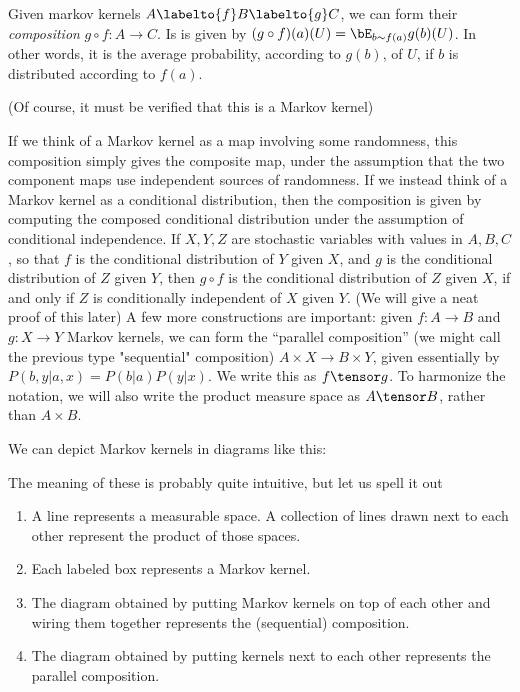 \documentclass{article}
\begin{document}
\begin{definition}
Given markov kernels $A \labelto{f} B \labelto{g} C$, we can form their \emph{composition} $g\circ f: A \to C$.
Is is given by $(g\circ f)(a)(U) = \bE_{b \sim f(a)}g(b)(U)$.
In other words, it is the average probability, according to $g(b)$, of $U$, if $b$ is distributed according to $f(a)$.
\end{definition}
(Of course, it must be verified that this is a Markov kernel)

If we think of a Markov kernel as a map involving some randomness, this composition simply gives the composite map, under the assumption that the two component maps use independent sources of randomness.
If we instead think of a Markov kernel as a conditional distribution, then the composition is given by computing the composed conditional distribution under the assumption of conditional independence.
If $X, Y, Z$ are stochastic variables with values in $A,B,C$, so that $f$ is the conditional distribution of $Y$ given $X$, and $g$ is the conditional distribution of $Z$ given $Y$, then $g\circ f$ is the conditional distribution of $Z$ given $X$, if and only if $Z$ is conditionally independent of $X$ given $Y$. (We will give a neat proof of this later)
A few more constructions are important: given $f:A \to B$ and $g:X \to Y$ Markov kernels, we can form the ``parallel composition'' (we might call the previous type "sequential" composition) $A \times X \to B \times Y$,
given essentially by $P(b,y|a,x) = P(b|a)P(y|x)$. We write this as $f \tensor g$. To harmonize the notation, we will also write the product measure space as $A \tensor B$, rather than $A \times B$.


We can depict Markov kernels in diagrams like this:


The meaning of these is probably quite intuitive, but let us spell it out

\begin{enumerate}
    \item A line represents a measurable space. A collection of lines drawn next to each other represent the product of those spaces. 
    \item Each labeled box represents a Markov kernel.
    \item The diagram obtained by putting Markov kernels on top of each other and wiring them together represents the (sequential) composition.
    \item The diagram obtained by putting kernels next to each other represents the parallel composition.\footnotemark
\end{enumerate}
\end{document}
